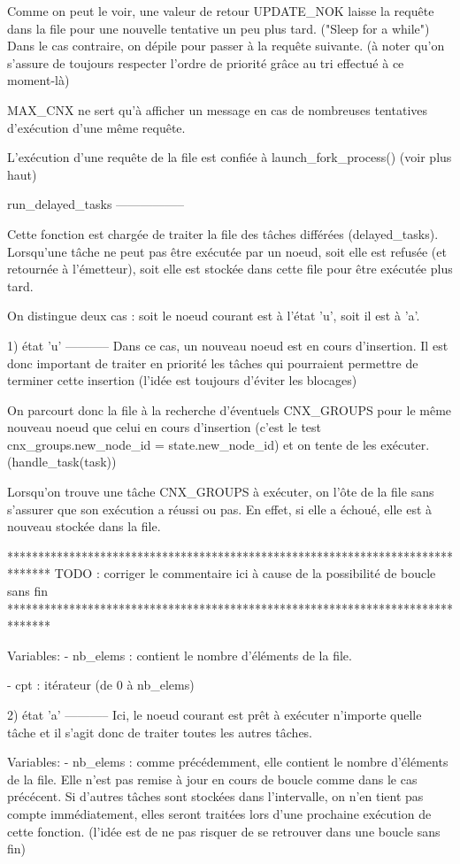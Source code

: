 Comme on peut le voir, une valeur de retour UPDATE_NOK laisse la requête dans la file pour une
nouvelle tentative un peu plus tard. ("Sleep for a while") Dans le cas contraire, on dépile pour
passer à la requête suivante. (à noter qu'on s'assure de toujours respecter l'ordre de priorité
grâce au tri effectué à ce moment-là)

MAX_CNX ne sert qu'à afficher un message en cas de nombreuses tentatives d'exécution d'une même
requête.

L'exécution d'une requête de la file est confiée à launch_fork_process() (voir plus haut)

run_delayed_tasks
-----------------

Cette fonction est chargée de traiter la file des tâches différées (delayed_tasks). Lorsqu'une tâche
ne peut pas être exécutée par un noeud, soit elle est refusée (et retournée à l'émetteur), soit
elle est stockée dans cette file pour être exécutée plus tard.

On distingue deux cas : soit le noeud courant est à l'état 'u', soit il est à 'a'.

1) état 'u'
-----------
Dans ce cas, un nouveau noeud est en cours d'insertion. Il est donc important de traiter en priorité
les tâches qui pourraient permettre de terminer cette insertion (l'idée est toujours d'éviter les
blocages)

On parcourt donc la file à la recherche d'éventuels CNX_GROUPS pour le même nouveau noeud que celui
en cours d'insertion (c'est le test cnx_groups.new_node_id = state.new_node_id) et on tente de les
exécuter. (handle_task(task))

Lorsqu'on trouve une tâche CNX_GROUPS à exécuter, on l'ôte de la file sans s'assurer que son
exécution a réussi ou pas. En effet, si elle a échoué, elle est à nouveau stockée dans la file.

*******************************************************************************
TODO : corriger le commentaire ici à cause de la possibilité de boucle sans fin
*******************************************************************************

Variables: 
    - nb_elems : contient le nombre d'éléments de la file.

    - cpt      : itérateur (de 0 à nb_elems)

2) état 'a'
-----------
Ici, le noeud courant est prêt à exécuter n'importe quelle tâche et il s'agit donc de traiter toutes
les autres tâches.

Variables:
    - nb_elems   :      comme précédemment, elle contient le nombre d'éléments de la file.
                        Elle n'est pas remise à jour en cours de boucle comme dans le cas précécent.
                        Si d'autres tâches sont stockées dans l'intervalle, on n'en tient pas compte
                        immédiatement, elles seront traitées lors d'une prochaine exécution de cette
                        fonction. (l'idée est de ne pas risquer de se retrouver dans une boucle sans
                        fin)

